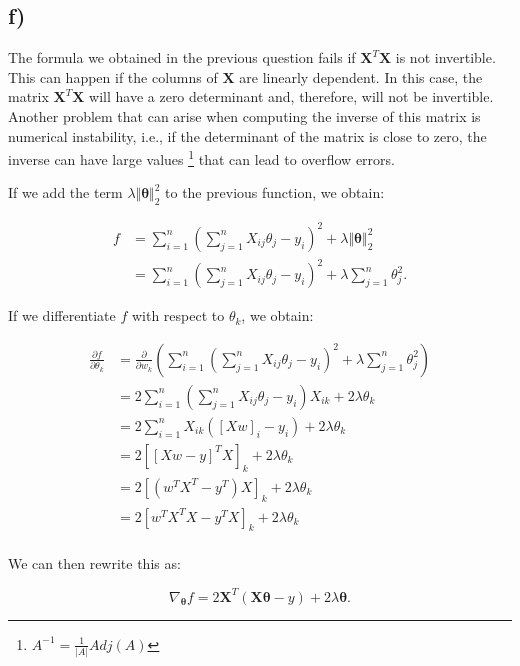 \documentclass[12pt,a4paper,oneside]{paper}
\begin{document}
\newpage
\subsection*{f)}

The formula we obtained in the previous question fails if \( \bm{X}^T \bm{X} \) is not invertible.
This can happen if the columns of \( \bm{X} \) are linearly dependent.
In this case, the matrix \( \bm{X}^T \bm{X} \) will have a zero determinant and, therefore, will not be  invertible.
Another problem that can arise when computing the inverse of this matrix is numerical instability, i.e.,
if the determinant of the matrix is close to zero, the inverse can have large values \footnote{$A^{-1} = \frac{1}{|A|} Adj(A)$} that can lead to overflow errors. 

If we add the term \( \lambda \mathbf{\Vert \bm{\theta} \Vert }_2^2 \) to the previous function, we obtain:

\begin{align*}
f &= \sum_{i=1}^{n} \left( \sum_{j=1}^{n} X_{ij} \theta_j - y_i \right)^2 + \lambda \mathbf{\Vert \theta \Vert }_2^2 \\
&= \sum_{i=1}^{n} \left( \sum_{j=1}^{n} X_{ij} \theta_j - y_i \right)^2 + \lambda \sum_{j=1}^{n} \theta_j^2.
\end{align*}

If we differentiate \( f \) with respect to \( \theta_k \), we obtain:

\begin{align*}
\frac{\partial f}{\partial \theta_k} &= \frac{\partial}{\partial w_k} ( \sum_{i=1}^{n} \left( \sum_{j=1}^{n} X_{ij} \theta_j - y_i \right)^2 + \lambda \sum_{j=1}^{n} \theta_j^2 ) \\
&= 2 \sum_{i=1}^{n} \left( \sum_{j=1}^{n} X_{ij} \theta_j - y_i \right) X_{ik} + 2 \lambda \theta_k \\
&= 2 \sum_{i=1}^{n} X_{ik} \left([ X w]_i  - y_i\right) + 2 \lambda \theta_k \\
&= 2 [[X w  - y ]^T X]_k + 2 \lambda \theta_k \\
&= 2 [(w^T X^T - y^T) X]_k + 2 \lambda \theta_k \\
&= 2 [w^T X^T X - y^T X]_k + 2 \lambda \theta_k \\
\end{align*}

We can then rewrite this as:

\[
\nabla_{\bm{\theta}} f = 2 \bm{X}^T (\bm{X} \bm{\theta} - y) + 2 \lambda \bm{\theta}.
\]
\end{document}
